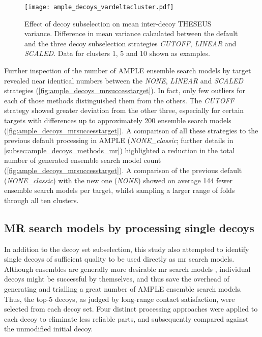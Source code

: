 \begin{figure}[H]
    \centering
    \texttt{[image: ample\_decoys\_vardeltacluster.pdf]}
    \caption[Effect of decoy subselection on THESEUS variance]{Effect of decoy subselection on mean inter-decoy THESEUS variance. Difference in mean variance calculated between the default and the three decoy subselection strategies \textit{CUTOFF}, \textit{LINEAR} and \textit{SCALED}. Data for clusters 1, 5 and 10 shown as examples.}
    \label{fig:ample_decoys_vardeltacluster}
\end{figure}

Further inspection of the number of AMPLE ensemble search models by target revealed near identical numbers between the \textit{NONE}, \textit{LINEAR} and \textit{SCALED} strategies (\cref{fig:ample_decoys_mrsuccesstarget}). In fact, only few outliers for each of those methods distinguished them from the others. The \textit{CUTOFF} strategy showed greater deviation from the other three, especially for certain targets with differences up to approximately 200 ensemble search models (\cref{fig:ample_decoys_mrsuccesstarget}). A comparison of all these strategies to the previous default processing in AMPLE (\textit{NONE\_classic}; further details in \cref{subsec:ample_decoys_methods_mr}) highlighted a reduction in the total number of generated ensemble search model count (\cref{fig:ample_decoys_mrsuccesstarget}). A comparison of the previous default (\textit{NONE\_classic}) with the new one (\textit{NONE}) showed on average 144 fewer ensemble search models per target, whilst sampling a larger range of folds through all ten clusters.

\subsection{MR search models by processing single decoys}
In addition to the decoy set subselection, this study also attempted to identify single decoys of sufficient quality to be used directly as \gls{mr} search models. Although ensembles are generally more desirable \gls{mr} search models \cite{Rigden2018-zt,Keegan2018-kn,Thomas2015-wu}, individual decoys might be successful by themselves, and thus save the overhead of generating and trialling a great number of AMPLE ensemble search models. Thus, the top-5 decoys, as judged by long-range contact satisfaction, were selected from each decoy set. Four distinct processing approaches were applied to each decoy to eliminate less reliable parts, and subsequently compared against the unmodified initial decoy.

